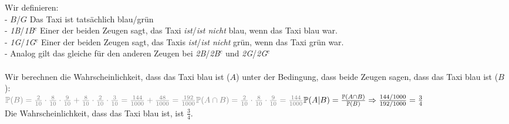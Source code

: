 \documentclass[a4paper]{article}
\begin{document}
Wir definieren:\\
- $B$/$G$ Das Taxi ist tatsächlich blau/grün\\
- \textit{1B}/\textit{1B}$^c$ Einer der beiden Zeugen sagt, das Taxi \textit{ist}/\textit{ist nicht} blau, wenn das Taxi blau war.\\
- \textit{1G}/\textit{1G}$^c$ Einer der beiden Zeugen sagt, das Taxis \textit{ist}/\textit{ist nicht} grün, wenn das Taxi 
grün war.\\
- Analog gilt das gleiche für den anderen Zeugen bei \textit{2B}/\textit{2B}$^c$ und \textit{2G}/\textit{2G}$^c$
\\\\
Wir berechnen die Wahrscheinlichkeit, dass das Taxi blau ist ($A$) unter der Bedingung, dass beide Zeugen sagen, dass das Taxi blau ist ($B$):\\
\(\textcolor{gray}{\mathbb{P}(B)= \frac{2}{10}\cdot \frac{8}{10} \cdot \frac{9}{10} + \frac{8}{10}\cdot \frac{2}{10}\cdot \frac{3}{10}= \frac{144}{1000}+\frac{48}{1000}=\frac{192}{1000}}\\
\textcolor{gray}{\mathbb{P}(A \cap B ) = \frac{2}{10}\cdot \frac{8}{10} \cdot \frac{9}{10} = \frac{144}{1000}}\\
\mathbb{P}(A \vert B)= \frac{\mathbb{P}(A \cap B)}{\mathbb{P}(B)}\Rightarrow \frac{144/1000}{192/1000}=\frac{3}{4}\)\\
Die Wahrscheinlichkeit, dass das Taxi blau ist, ist $\frac{3}{4}$.
\clearpage
\end{document}
